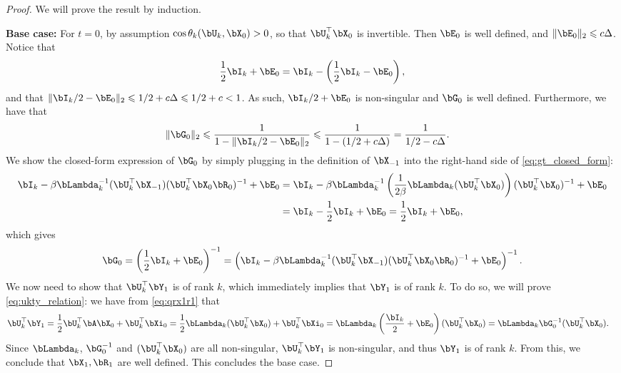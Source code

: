 \documentclass{article}
\theoremstyle{plain}
\theoremstyle{definition}
\theoremstyle{remark}
\begin{document}
\begin{proof}
  We will prove the result by induction. 
  
  \textbf{Base case:} For $t=0$, by assumption $\cos\theta_k(\bU_k,\bX_0) > 0$, so that $\bU_k^\top \bX_0$ is invertible. Then $\bE_0$ is well defined, and $\Vert\bE_0\Vert_2 \leqslant c\Delta$. Notice that
  \begin{align*}
    \frac{1}{2}\bI_k + \bE_0 = \bI_k - \left(\frac{1}{2}\bI_k - \bE_0\right),
  \end{align*}
  and that $\Vert \bI_k/2 - \bE_0 \Vert_2 \leqslant 1/2 + c\Delta \leqslant 1/2 + c < 1$. As such, $\bI_k/2+ \bE_0$ is non-singular and $\bG_0$ is well defined. Furthermore, we have that
  \begin{align*}
    \Vert \bG_0 \Vert_2 & \leqslant \frac{1}{1 - \Vert \bI_k/2 - \bE_0 \Vert_2} \leqslant \frac{1}{1 - (1/2 + c\Delta)} = \frac{1}{1/2 - c\Delta}.
  \end{align*}
  We show the closed-form expression of $\bG_0$ by simply plugging in the definition of $\bX_{-1}$ into the right-hand side of \eqref{eq:gt_closed_form}:
  \begin{align*}
    \bI_k - \beta\bLambda_k^{-1}(\bU_k^\top \bX_{-1}) (\bU_k^\top \bX_{0}\bR_0)^{-1} + \bE_0 & = \bI_k - \beta\bLambda_k^{-1}\left(\frac{1}{2\beta}\bLambda_k (\bU_k^\top \bX_0)\right)(\bU_k^\top \bX_0)^{-1} + \bE_0 \\
    & = \bI_k - \frac{1}{2}\bI_k + \bE_0 = \frac{1}{2}\bI_k + \bE_0,
  \end{align*}
  which gives
  \begin{align*}
    \bG_0 = \left( \frac{1}{2}\bI_k + \bE_0\right)^{-1} = \left( \bI_k - \beta\bLambda_k^{-1}(\bU_k^\top \bX_{-1}) (\bU_k^\top \bX_{0}\bR_0)^{-1} + \bE_0\right)^{-1}.
  \end{align*}
  We now need to show that $\bU_k^\top \bY_1$ is of rank $k$, which immediately implies that $\bY_1$ is of rank $k$. To do so, we will prove \eqref{eq:ukty_relation}: we have from \eqref{eq:qrx1r1} that
  \begin{align*}
    \bU_k^\top\bY_1 & = \frac{1}{2}\bU_k^\top\bA \bX_0 + \bU_k^\top\bXi_0 = \frac{1}{2}\bLambda_k(\bU_k^\top\bX_0) + \bU_k^\top\bXi_0 = \bLambda_k\left(\frac{\bI_k}{2} + \bE_0\right)(\bU_k^\top\bX_0) = \bLambda_k \bG_0^{-1} (\bU_k^\top \bX_0).
  \end{align*}
  Since $\bLambda_k$, $\bG_0^{-1}$ and $(\bU_k^\top\bX_0)$ are all non-singular, $\bU_k^\top\bY_1$ is non-singular, and thus $\bY_1$ is of rank $k$. From this, we conclude that $\bX_1, \bR_1$ are well defined. This concludes the base case.


\end{proof}
\end{document}
